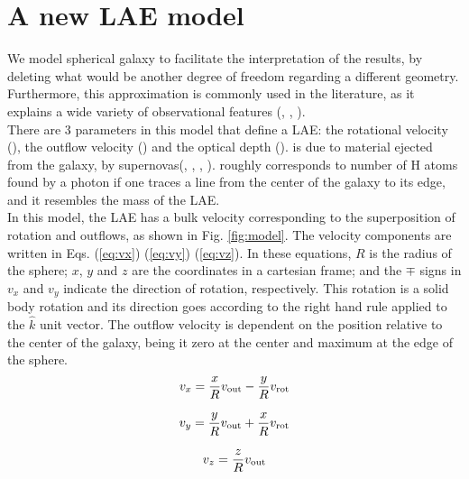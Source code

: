 \documentclass[twocolappendix]{latex/emulateapj}
\begin{document}
\section{A new LAE model}
\label{sec:newmodel}

We model spherical galaxy to facilitate the interpretation of the results, by deleting what would be another degree of freedom regarding a different geometry. Furthermore, this approximation is commonly used in the literature, as it explains a wide variety of observational features (\cite{Ahn03}, \cite{Verhamme06}, \cite{Dijkstra06}). \\

There are 3 parameters in this model that define a LAE: the rotational velocity (\vrot), the outflow velocity (\vout) and the optical depth (\tauh). \vout is due to material ejected from the galaxy, by supernovas(\cite{Verhamme06}, \cite{Orsi12}, \cite{Hashimoto2015}, \cite{Gronke2015}). \tauh roughly corresponds to number of H atoms found by a \lya photon if one traces a line from the center of the galaxy to its edge, and it resembles the mass of the LAE.\\

In this model, the LAE has a bulk velocity corresponding to the superposition of rotation and outflows, as shown in Fig. \ref{fig:model}. The velocity components are written in Eqs. (\ref{eq:vx}) (\ref{eq:vy}) (\ref{eq:vz}). In these equations, $R$ is the radius of the sphere; $x$, $y$ and $z$ are the coordinates in a cartesian frame; and the $\mp$ signs in $v_x$ and $v_y$ indicate the direction of rotation, respectively. This rotation is a solid body rotation and its direction goes according to the right hand rule applied to the $\hat{k}$ unit vector. The outflow velocity is dependent on the position relative to the center of the galaxy, being it zero at the center and maximum at the edge of the sphere.\\

\begin{equation}
	v_{x}=\frac{x}{R}v_{\rm out}-\frac{y}{R}v_{\rm rot} 
	\label{eq:vx}
\end{equation}

\begin{equation}
	v_{y}=\frac{y}{R}v_{\rm out}+\frac{x}{R}v_{\rm rot} 
	\label{eq:vy}
\end{equation}

\begin{equation}
	v_{z}=\frac{z}{R}v_{\rm out}
	\label{eq:vz}
\end{equation}
\end{document}
